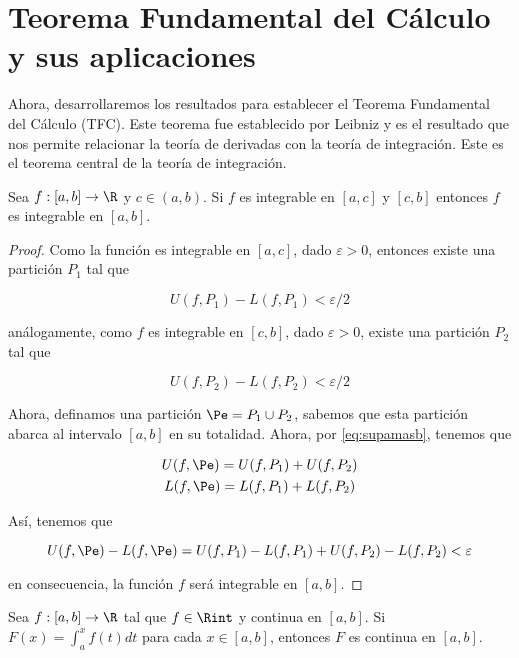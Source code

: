 \section{Teorema Fundamental del Cálculo y sus aplicaciones}

Ahora, desarrollaremos los resultados para establecer el Teorema Fundamental del Cálculo (TFC). Este teorema fue establecido por Leibniz y es el resultado que nos permite relacionar la teoría de derivadas con la teoría de integración. Este es el teorema central de la teoría de integración.

\begin{lem}
    Sea $f: [a,b] \rightarrow \R$ y $c \in (a,b)$. Si $f$ es integrable en $[a,c]$ y $[c,b]$ entonces $f$ es integrable en $[a,b]$.
\end{lem}

\begin{proof}
    Como la función es integrable en $[a,c]$, dado $\varepsilon > 0$, entonces existe una partición $P_1$ tal que
    
    \[
    U(f, P_1) - L(f, P_1) < \varepsilon/2
    \]
    
    \noindent análogamente, como $f$ es integrable en $[c,b]$, dado $\varepsilon > 0$, existe una partición $P_2$ tal que
    
    \[
    U(f, P_2) - L(f, P_2) < \varepsilon/2
    \]
    
    Ahora, definamos una partición $\Pe = P_1 \cup P_2$, sabemos que esta partición abarca al intervalo $[a,b]$ en su totalidad. Ahora, por \ref{eq:supamasb}, tenemos que
    
    \begin{gather*}
        U(f, \Pe) = U(f, P_1) + U(f, P_2) \\
        L(f, \Pe) = L(f, P_1) + L(f, P_2)
    \end{gather*}
    
    Así, tenemos que
    
    \[
    U(f, \Pe) - L(f, \Pe) = U(f, P_1) - L(f, P_1) + U(f, P_2) - L(f, P_2) < \varepsilon
    \]
    
    \noindent en consecuencia, la función $f$ será integrable en $[a,b]$.
\end{proof}

\begin{teo}
    Sea $f: [a,b] \rightarrow \R$ tal que $f \in \Rint$ y continua en $[a,b]$. Si $F(x) = \int_a^x f(t)dt$ para cada $x \in [a,b]$, entonces $F$ es continua en $[a,b]$.
\end{teo}

